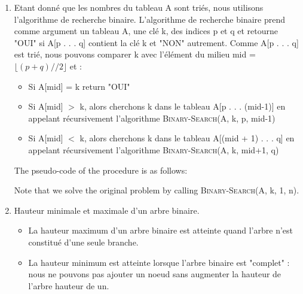 \begin{Exercice}[20 minutes]
\begin{enumerate}
	\end{enumerate}
	\begin{solution}
		\begin{enumerate}
			\item Etant donné que les nombres du tableau A sont triés, nous utilisons l'algorithme de recherche binaire. L'algorithme de recherche binaire  prend comme argument un tableau A, une clé k, des indices p et q et retourne "OUI" si A[p . . . q]  contient la clé k et "NON" autrement. Comme A[p . . . q] est trié, nous pouvons comparer k avec l'élément du milieu mid = $\lfloor(p+q)//2\rfloor$  et : \\
				\begin{itemize}
					\item Si A[mid] = k return "OUI" \\
					\item Si A[mid] $>$ k, alors cherchons k dans le tableau A[p . . . (mid-1)] en appelant récursivement l'algorithme \textsc{Binary-Search}(A, k, p, mid-1) \\
					\item Si A[mid] $<$ k, alors cherchons k dans le tableau A[(mid + 1) . . . q] en appelant récursivement l'algorithme \textsc{Binary-Search}(A, k, mid+1, q)\\
				\end{itemize}
				The pseudo-code of the procedure is as follows:
				
				Note that we solve the original problem by calling \textsc{Binary-Search}(A, k, 1, n).
			\item Hauteur minimale et maximale d'un arbre binaire.
				\begin{itemize}
					\item La hauteur maximum d'un arbre binaire est atteinte quand l'arbre n'est constitué d'une seule branche. \\
					\item La hauteur minimum est atteinte lorsque l'arbre binaire est "complet" : nous ne pouvons pas ajouter un noeud sans augmenter la hauteur de l'arbre hauteur de un. \\

\end{itemize}
\end{enumerate}
\end{solution}
\end{Exercice}
